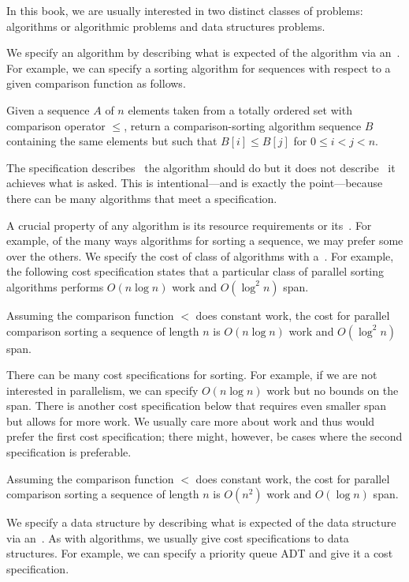In this book, we are usually interested in two distinct classes of
problems: algorithms or algorithmic problems and data structures
problems.

We specify an algorithm by describing what is expected of the
algorithm via an~.
%
For example, we can specify a sorting algorithm for sequences with
respect to a given comparison function as follows.

Given a sequence $A$ of $n$ elements taken from a totally ordered set
with comparison operator $\leq$, return a comparison-sorting algorithm
sequence $B$ containing the same elements but such that $B[i] \leq
B[j]$ for $0 \leq i < j < n$.

The specification describes~ the algorithm should do but it
does not describe~ it achieves what is asked.
%
This is intentional---and is exactly the point---because there can be
many algorithms that meet a specification.
%

A crucial property of any algorithm is its resource requirements or
its~.
%
For example, of the many ways algorithms for sorting a sequence, we
may prefer some over the others.  
%
We specify the cost of class of algorithms with a~.  For example, the following cost specification
states that a particular class of parallel sorting algorithms performs
$O(n \log{n})$ work and $O(\log^2{n})$ span.

Assuming the comparison function $<$ does constant work, the cost for
parallel comparison sorting a sequence of length $n$ is $O(n \log n)$
work and $O(\log^2 n)$ span.

There can be many cost specifications for sorting.  For example, if we
are not interested in parallelism, we can specify $O(n \log{n})$ work
but no bounds on the span. There is another cost specification below
that requires even smaller span but allows for more work.
%
We usually care more about work and thus would prefer the first cost
specification; there might, however, be cases where the second
specification is preferable.

Assuming the comparison function $<$ does constant work, the cost for
parallel comparison sorting a sequence of length $n$ is $O(n^2)$ work
and $O(\log n)$ span.

We specify a data structure by describing what is expected of the data
structure via an~.
%
As with algorithms, we usually give cost specifications to data
structures.
%
For example, we can specify a priority queue ADT and give it a cost
specification. 
%

